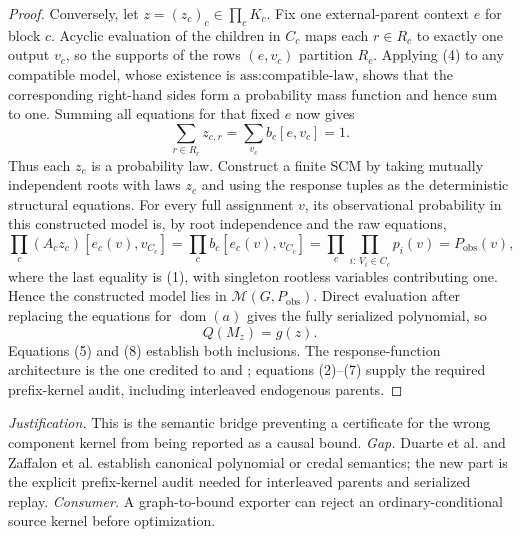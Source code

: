 \documentclass{article}
\begin{document}
\begin{proof}
Conversely, let \(z=(z_c)_c\in\prod_cK_c\).  Fix one external-parent context \(e\) for block \(c\).  Acyclic evaluation of the children in \(C_c\) maps each \(r\in R_c\) to exactly one output \(v_c\), so the supports of the rows \((e,v_c)\) partition \(R_c\).  Applying (4) to any compatible model, whose existence is \(\text{ass:compatible-law}\), shows that the corresponding right-hand sides form a probability mass function and hence sum to one.  Summing all equations for that fixed \(e\) now gives
\[
\sum_{r\in R_c}z_{c,r}=
\sum_{v_c}b_c[e,v_c]=1. \tag{6}
\]
Thus each \(z_c\) is a probability law.  Construct a finite SCM by taking mutually independent roots with laws \(z_c\) and using the response tuples as the deterministic structural equations.  For every full assignment \(v\), its observational probability in this constructed model is, by root independence and the raw equations,
\[
\prod_c (A_cz_c)[e_c(v),v_{C_c}]
=\prod_c b_c[e_c(v),v_{C_c}]
=\prod_c\prod_{i:\,V_i\in C_c}p_i(v)
=P_{\mathrm{obs}}(v), \tag{7}
\]
where the last equality is (1), with singleton rootless variables contributing one.  Hence the constructed model lies in \(\mathcal M(G,P_{\mathrm{obs}})\).  Direct evaluation after replacing the equations for \(\operatorname{dom}(a)\) gives the fully serialized polynomial, so
\[
Q(M_z)=g(z). \tag{8}
\]
Equations (5) and (8) establish both inclusions.  The response-function architecture is the one credited to \cite{ShridharanIyengar2023} and \cite{ZaffalonAntonucciCabanas2020}; equations (2)--(7) supply the required prefix-kernel audit, including interleaved endogenous parents.
\end{proof}
\par\smallskip\noindent \textit{Justification.} This is the semantic bridge preventing a certificate for the wrong component kernel from being reported as a causal bound. \textit{Gap.} Duarte et al. and Zaffalon et al. establish canonical polynomial or credal semantics; the new part is the explicit prefix-kernel audit needed for interleaved parents and serialized replay. \textit{Consumer.} A graph-to-bound exporter can reject an ordinary-conditional source kernel before optimization.
\end{document}
